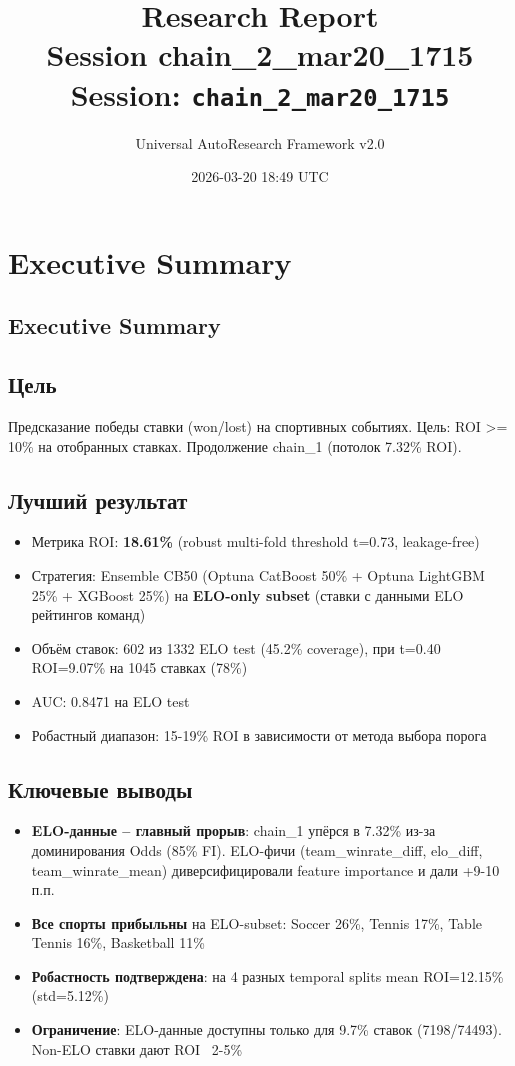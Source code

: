 \documentclass[12pt,a4paper]{article}
\title{
    \Large\textbf{Research Report}\\[0.5em]
    \large Session chain\_2\_mar20\_1715\\[0.3em]
    \normalsize Session: \texttt{chain\_2\_mar20\_1715}
}
\author{Universal AutoResearch Framework v2.0}
\date{2026-03-20 18:49 UTC}
\begin{document}
\maketitle
\tableofcontents
\newpage


\section{Executive Summary}

\subsection{Executive Summary}

\subsection{Цель}
Предсказание победы ставки (won/lost) на спортивных событиях. Цель: ROI >= 10\% на отобранных ставках. Продолжение chain\_1 (потолок 7.32\% ROI).

\subsection{Лучший результат}
\begin{itemize}
  \item Метрика ROI: \textbf{18.61\%} (robust multi-fold threshold t=0.73, leakage-free)
  \item Стратегия: Ensemble CB50 (Optuna CatBoost 50\% + Optuna LightGBM 25\% + XGBoost 25\%) на \textbf{ELO-only subset} (ставки с данными ELO рейтингов команд)
  \item Объём ставок: 602 из 1332 ELO test (45.2\% coverage), при t=0.40 ROI=9.07\% на 1045 ставках (78\%)
  \item AUC: 0.8471 на ELO test
  \item Робастный диапазон: 15-19\% ROI в зависимости от метода выбора порога
\end{itemize}

\subsection{Ключевые выводы}
\begin{itemize}
  \item \textbf{ELO-данные -- главный прорыв}: chain\_1 упёрся в 7.32\% из-за доминирования Odds (85\% FI). ELO-фичи (team\_winrate\_diff, elo\_diff, team\_winrate\_mean) диверсифицировали feature importance и дали +9-10 п.п.
  \item \textbf{Все спорты прибыльны} на ELO-subset: Soccer 26\%, Tennis 17\%, Table Tennis 16\%, Basketball 11\%
  \item \textbf{Робастность подтверждена}: на 4 разных temporal splits mean ROI=12.15\% (std=5.12\%)
  \item \textbf{Ограничение}: ELO-данные доступны только для 9.7\% ставок (7198/74493). Non-ELO ставки дают ROI ~2-5\%
\end{itemize}
\end{document}
